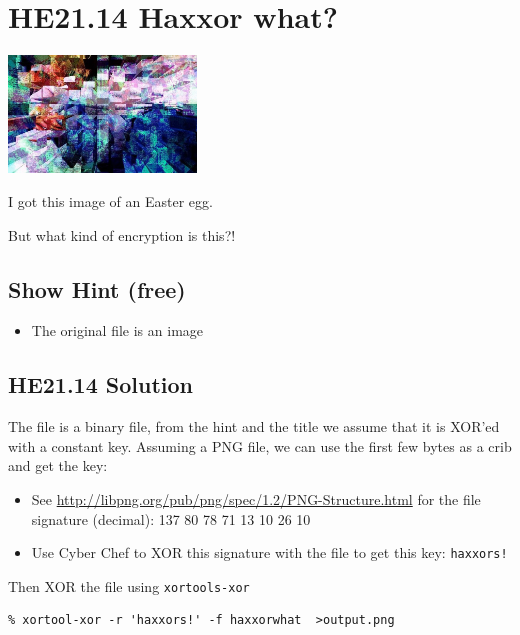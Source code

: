 \documentclass[english,a4paper,nols,noindent]{tufte-handout}
\begin{document}
\pagebreak
\hypertarget{he21.14}{%
  \section{HE21.14 Haxxor what?}
  \label{he21.14}}
\begin{marginfigure}
    \includegraphics[width=50mm]{images/challenge14.jpg}
\end{marginfigure}

I got this image of an Easter egg.

\noindent  But what kind of encryption is this?!

\subsection{Show Hint (free)}
\begin{itemize}
\item The original file is an image
\end{itemize}


\hypertarget{he21.14-solution}{%
\subsection{HE21.14 Solution}\label{he21.14-solution}}

\noindent The file is a binary file, from the hint and the title we assume that
it is XOR'ed with a constant key.  Assuming a PNG file, we can use the first few
bytes as a crib and get the key:
\begin{itemize}
\item See \url{http://libpng.org/pub/png/spec/1.2/PNG-Structure.html} for the
    file signature (decimal): 137 80 78 71 13 10 26 10
\item Use Cyber Chef to XOR this signature with the file to get this key: \verb+haxxors!+
\end{itemize}

\noindent Then XOR the file using \verb+xortools-xor+

\begin{verbatim}
% xortool-xor -r 'haxxors!' -f haxxorwhat  >output.png 
\end{verbatim}
\end{document}
